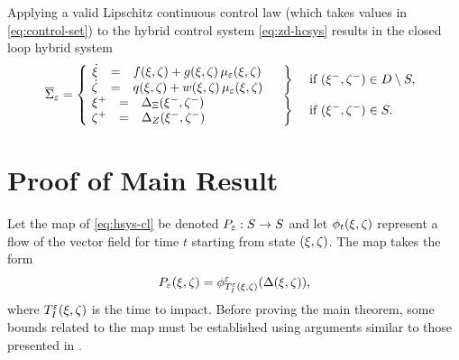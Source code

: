 % 
Applying a valid Lipschitz continuous control law (which takes values in
\eqref{eq:control-set}) to the hybrid control system \eqref{eq:zd-hcsys} results
in the closed loop hybrid system
%
\begin{align}
  \label{eq:zd-hsys-cl}
  \HSbar_{\resclfparam} = \left\{\!\!\!\!
  \begin{array}{l c l}
    \begin{array}{r c l}
      {\dot \zdx} &=& f\argsxz + g\argsxz \, \mueps\argsxz\\
      {\dot \zdz} &=& q\argsxz + w\argsxz \, \mueps\argsxz
    \end{array} &
    \left.\vphantom{\begin{array}{r c l}
          {\dot \zdx} &=& f\argsxz + g\argsxz \, \mueps\argsxz\\
          {\dot \zdz} &=& q\argsxz + w\argsxz \, \mueps\argsxz
        \end{array}}\right\} & \mbox{ if } \argsxzm \in \D \setminus \Guard,\\
    \begin{array}{r c l}
      \zdx^{+} &=& \DeltaX(\zdx^{-}, \zdz^{-})\\
      \zdz^{+} &=& \DeltaZ(\zdx^{-}, \zdz^{-})
    \end{array}  &
    \left.\vphantom{\begin{array}{r c l}
          \zdx^{+} &=& \DeltaX(\zdx^{-}, \zdz^{-})\\
          \zdz^{+} &=& \DeltaZ(\zdx^{-}, \zdz^{-})
        \end{array}}\right\} & \mbox{ if } \argsxzm \in \Guard.
  \end{array}\right.
\end{align}

\section{Proof of Main Result} \label{sec:proof}

Let the \Poincare{} map of \eqref{eq:hsys-cl} be denoted $P_{\varepsilon} : S \to
S$ and let $\phi_{t}(\xi, \zeta)$ represent a flow of the vector field for time
$t$ starting from state $(\xi, \zeta)$.
%
The \Poincare{} map takes the form
%
\begin{align}
  \label{eq:poincare}
  P_{\varepsilon}(\xi, \zeta) = \phi^{\varepsilon}_{T_{I}^{\varepsilon}(\xi, \zeta)}(\Delta(\xi, \zeta)),
\end{align}
%
where $T_{I}^{\varepsilon}(\xi, \zeta)$ is the time to impact.
%
Before proving the main theorem, some bounds related to the \Poincare{} map must
be established using arguments similar to those presented in
\cite{Ames2014,Morris2005}.

